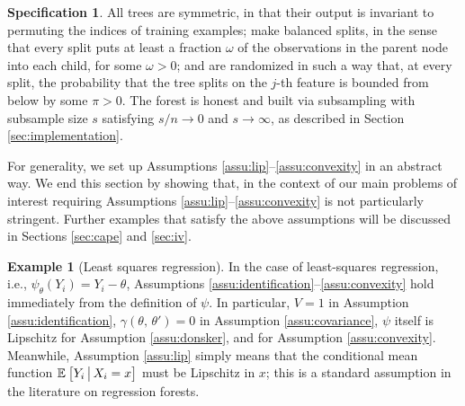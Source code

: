 \documentclass[aos]{imsart}
\theoremstyle{plain}
\theoremstyle{definition}
\newtheorem{exam}{Example}
\newtheorem{spec}{Specification}
\theoremstyle{remark}
\begin{document}
\begin{CJK}{UTF8}{gbsn}
{\begin{spec}
\label{spec:forest}
All trees are symmetric, in that their output is invariant to permuting
the indices of training examples;
make balanced splits, in the sense that every split puts at least a fraction
$\omega$ of the observations in the parent node into each child, for some $\omega > 0$; and
are randomized in such a way that, at every split, the probability that
the tree splits on the $j$-th feature is bounded from below by some $\pi > 0$.
The forest is honest and built via subsampling
with subsample size $s$ satisfying $s/n \rightarrow 0$ and $s \rightarrow \infty$,
as described in Section \ref{sec:implementation}.
\end{spec}

For generality, we set up Assumptions \ref{assu:lip}--\ref{assu:convexity}
in an abstract way. We end this section by showing that, in the context of our
main problems of interest requiring Assumptions \ref{assu:lip}--\ref{assu:convexity} is
not particularly stringent. Further examples that satisfy the above assumptions will
be discussed in Sections \ref{sec:cape} and \ref{sec:iv}.

\begin{exam}[Least squares regression]
\label{exam:regression}
In the case of least-squares regression, i.e., $\psi_{\theta}(Y_i) = Y_i - \theta$,
Assumptions \ref{assu:identification}--\ref{assu:convexity} hold immediately from the
definition of $\psi$. In particular, $V = 1$ in Assumption \ref{assu:identification},
$\gamma(\theta, \, \theta') = 0$ in Assumption \ref{assu:covariance},
$\psi$ itself is Lipschitz for Assumption \ref{assu:donsker}, and 
 for Assumption \ref{assu:convexity}.
Meanwhile, Assumption \ref{assu:lip} simply means that
the conditional mean function $\mathbb{E}_{}\left[Y_i \,\big|\, X_i = x\right]$ must be Lipschitz in $x$;
this is a standard assumption in the literature on regression forests.
\end{exam}

}
\end{CJK}
\end{document}

